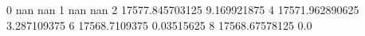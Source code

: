 0 nan nan
1 nan nan
2 17577.845703125 9.169921875
4 17571.962890625 3.287109375
6 17568.7109375 0.03515625
8 17568.67578125 0.0
